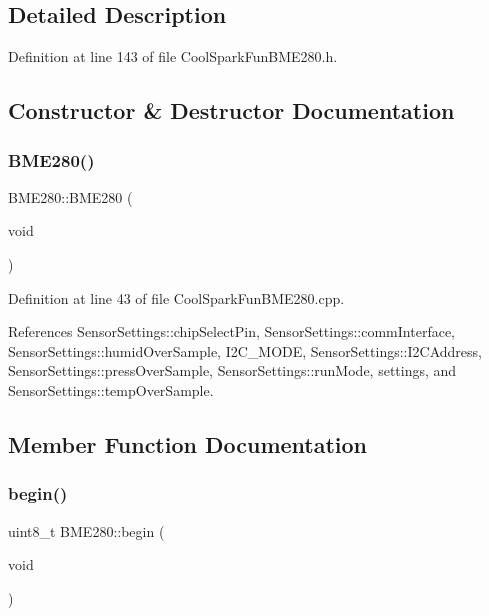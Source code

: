 \subsection{Detailed Description}


Definition at line 143 of file Cool\+Spark\+Fun\+B\+M\+E280.\+h.



\subsection{Constructor \& Destructor Documentation}
\mbox{\label{class_b_m_e280_a9b9354e010528a0c3d452aa2459b808c}} 
\subsubsection{\texorpdfstring{B\+M\+E280()}{BME280()}}
{\footnotesize\ttfamily B\+M\+E280\+::\+B\+M\+E280 (\begin{DoxyParamCaption}\item[{void}]{ }\end{DoxyParamCaption})}



Definition at line 43 of file Cool\+Spark\+Fun\+B\+M\+E280.\+cpp.



References Sensor\+Settings\+::chip\+Select\+Pin, Sensor\+Settings\+::comm\+Interface, Sensor\+Settings\+::humid\+Over\+Sample, I2\+C\+\_\+\+M\+O\+DE, Sensor\+Settings\+::\+I2\+C\+Address, Sensor\+Settings\+::press\+Over\+Sample, Sensor\+Settings\+::run\+Mode, settings, and Sensor\+Settings\+::temp\+Over\+Sample.



\subsection{Member Function Documentation}
\mbox{\label{class_b_m_e280_a994c102f010547f9c740a338ef9905c7}} 
\subsubsection{\texorpdfstring{begin()}{begin()}}
{\footnotesize\ttfamily uint8\+\_\+t B\+M\+E280\+::begin (\begin{DoxyParamCaption}\item[{void}]{ }\end{DoxyParamCaption})}



